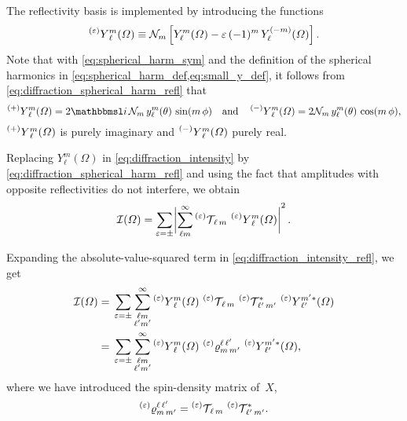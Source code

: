 The reflectivity basis is implemented by introducing the functions
\begin{equation}
  \label{eq:diffraction_spherical_harm_refl}
  \prescript{(\refl)}{}{Y}_\ell^m(\Omega)
  \equiv \mathcal{N}_m \sBrk[2]{Y_\ell^m(\Omega) - \refl\, (-1)^m\, Y_\ell^{(-m)}(\Omega)}.
\end{equation}
Note that with \cref{eq:spherical_harm_sym} and the definition of the
spherical harmonics in \cref{eq:spherical_harm_def,eq:small_y_def}, it
follows from \cref{eq:diffraction_spherical_harm_refl} that
\begin{equation}
  \prescript{(+)}{}{Y}_\ell^m(\Omega)
  = 2 \imag\, \mathcal{N}_m\, y_\ell^m(\theta)\, \sin(m\, \phi)
  \quad\text{and}\quad
  \prescript{(-)}{}{Y}_\ell^m(\Omega)
  = 2 \mathcal{N}_m\, y_\ell^m(\theta)\, \cos(m\, \phi),
\end{equation}
\ie $\prescript{(+)}{}{Y}_\ell^m(\Omega)$ is purely imaginary and
$\prescript{(-)}{}{Y}_\ell^m(\Omega)$ purely real.

Replacing $Y_\ell^m(\Omega)$ in \cref{eq:diffraction_intensity} by
\cref{eq:diffraction_spherical_harm_refl} and using the fact that
amplitudes with opposite reflectivities do not interfere, we obtain
\begin{equation}
  \label{eq:diffraction_intensity_refl}
  \mathcal{I}(\Omega)
  = \sum_{\refl = \pm} \Abs[3]{\sum_{\ell m}^\infty \prescript{(\refl)}{}{\mathcal{T}}_{\!\ell\, m}\, \prescript{(\refl)}{}{Y}_\ell^m(\Omega)}^2.
\end{equation}

Expanding the absolute-value-squared term in
\cref{eq:diffraction_intensity_refl}, we get
\begin{align}
  \mathcal{I}(\Omega)
  ={}& \sum_{\varepsilon = \pm} \sum_{\substack{\ell m \\ \ell' m'}}^\infty
  \prescript{(\ensuremath{\varepsilon})}{}{Y}_\ell^m(\Omega)\,
  \prescript{(\ensuremath{\varepsilon})}{}{\mathcal{T}}_{\!\ell\, m}\,
  \prescript{(\ensuremath{\varepsilon})}{}{\mathcal{T}}_{\!\ell'\, m'}^*\,
  \prescript{(\ensuremath{\varepsilon})}{}{Y}_{\ell'}^{m' *}(\Omega)
  \\
  \label{eq:diffraction_intensity_refl_spin-dens}
  ={}& \sum_{\varepsilon = \pm} \sum_{\substack{\ell m \\ \ell' m'}}^\infty
  \prescript{(\ensuremath{\varepsilon})}{}{Y}_\ell^m(\Omega)\, \prescript{(\ensuremath{\varepsilon})}{}{\varrho}^{\ell\, \ell'}_{m\, m'}\, \prescript{(\ensuremath{\varepsilon})}{}{Y}_{\ell'}^{m' *}(\Omega),
\end{align}
where we have introduced the spin-density matrix of~$X$,
\begin{equation}
  \label{eq:diffraction_refl_spin-dens}
  \prescript{(\ensuremath{\varepsilon})}{}{\varrho}^{\ell\, \ell'}_{m\, m'}
  = \prescript{(\ensuremath{\varepsilon})}{}{\mathcal{T}}_{\!\ell\, m}\, \prescript{(\ensuremath{\varepsilon})}{}{\mathcal{T}}_{\!\ell'\, m'}^*.
\end{equation}



